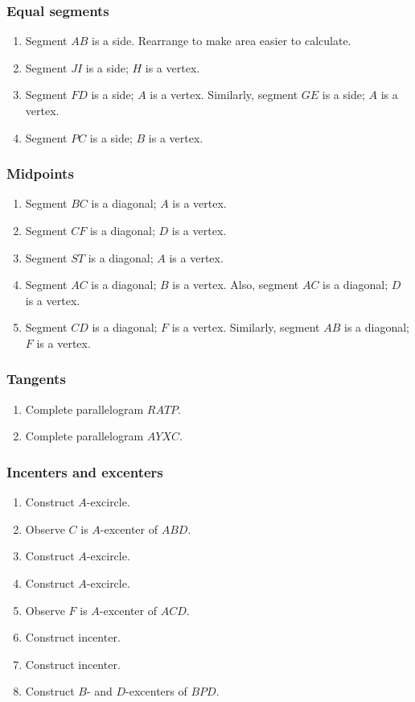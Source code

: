 \documentclass[11pt,paper=letter]{scrartcl}
\begin{document}
\subsubsection*{Equal segments}

\begin{enumerate}
  \item Segment $AB$ is a side. Rearrange to make area easier to calculate.
  \item Segment $JI$ is a side; $H$ is a vertex.
  \item Segment $FD$ is a side; $A$ is a vertex. Similarly, segment $GE$ is a side; $A$ is a vertex.
  \item Segment $PC$ is a side; $B$ is a vertex.
\end{enumerate}

\subsubsection*{Midpoints}

\begin{enumerate}
  \item Segment $BC$ is a diagonal; $A$ is a vertex.
  \item Segment $CF$ is a diagonal; $D$ is a vertex.
  \item Segment $ST$ is a diagonal; $A$ is a vertex.
  \item Segment $AC$ is a diagonal; $B$ is a vertex. Also, segment $AC$ is a diagonal; $D$ is a vertex.
  \item Segment $CD$ is a diagonal; $F$ is a vertex. Similarly, segment $AB$ is a diagonal; $F$ is a vertex.
\end{enumerate}

\subsubsection*{Tangents}

\begin{enumerate}
  \item Complete parallelogram $RATP$.
  \item Complete parallelogram $AYXC$.
\end{enumerate}

\subsubsection*{Incenters and excenters}

\begin{enumerate}
  \item Construct $A$-excircle.
  \item Observe $C$ is $A$-excenter of $ABD$.
  \item Construct $A$-excircle.
  \item Construct $A$-excircle.
  \item Observe $F$ is $A$-excenter of $ACD$.
  \item Construct incenter.
  \item Construct incenter.
  \item Construct $B$- and $D$-excenters of $BPD$.
\end{enumerate}
\end{document}
